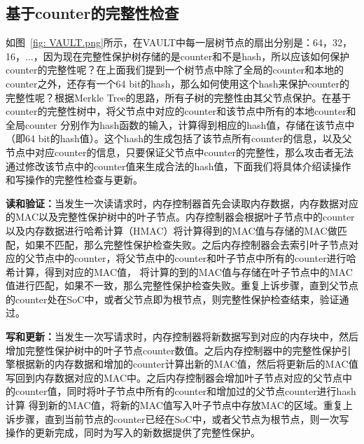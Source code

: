 \subsection{基于counter的完整性检查}
如图~\ref{fig: VAULT.png}所示，在VAULT中每一层树节点的扇出分别是：64，32，16，...，因为现在完整性保护树存储的是counter和不是hash，所以应该如何保护counter的完整性呢？在上面我们提到一个树节点中除了全局的counter和本地的counter之外，还存有一个64 bit的hash，那么如何使用这个hash来保护counter的完整性呢？根据Merkle Tree的思路，所有子树的完整性由其父节点保护。在基于counter的完整性树中，将父节点中对应的counter和该节点中所有的本地counter和全局counter
分别作为hash函数的输入，计算得到相应的hash值，存储在该节点中（即64 bit的hash值）。这个hash的生成包括了该节点所有counter的信息，以及父节点中对应counter的信息，只要保证父节点中counter的完整性，那么攻击者无法通过修改该节点中的counter值来生成合法的hash值，下面我们将具体介绍读操作和写操作的完整性检查与更新。

\textbf{读和验证：}当发生一次读请求时，内存控制器首先会读取内存数据，内存数据对应的MAC以及完整性保护树中的叶子节点。内存控制器会根据叶子节点中的counter以及内存数据进行哈希计算（HMAC）将计算得到的MAC值与存储的MAC做匹配，如果不匹配，那么完整性保护检查失败。之后内存控制器会去索引叶子节点对应的父节点中的counter，将父节点中的counter和叶子节点中所有的counter进行哈希计算，得到对应的MAC值，
将计算的到的MAC值与存储在叶子节点中的MAC值进行匹配，如果不一致，那么完整性保护检查失败。重复上诉步骤，直到父节点的counter处在SoC中，或者父节点即为根节点，则完整性保护检查结束，验证通过。

\textbf{写和更新：}当发生一次写请求时，内存控制器将新数据写到对应的内存块中，然后增加完整性保护树中的叶子节点counter数值。之后内存控制器中的完整性保护引擎根据新的内存数据和增加的counter计算出新的MAC值，然后将更新后的MAC值写回到内存数据对应的MAC中。之后内存控制器会增加叶子节点对应的父节点中的counter值，同时将叶子节点中所有的counter和增加过的父节点counter进行hash计算
得到新的MAC值，将新的MAC值写入叶子节点中存放MAC的区域。重复上诉步骤，直到当前节点的counter已经在SoC中，或者父节点为根节点，则一次写操作的更新完成，同时为写入的新数据提供了完整性保护。
